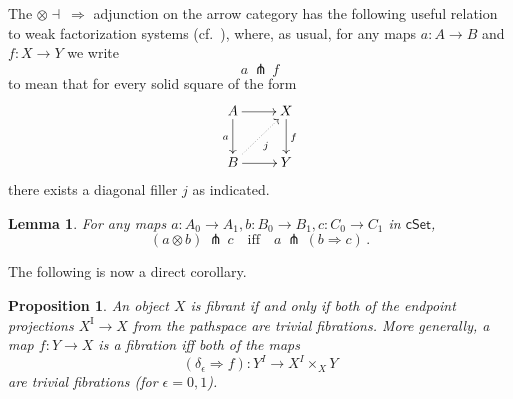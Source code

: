 \documentclass[11pt,reqno]{amsart}
\newcommand{\cSet}{\ensuremath{\mathsf{cSet}}}
\newcommand{\ra}{\ensuremath{\rightarrow}}
\renewcommand{\to}{\ensuremath{\rightarrow}}
\newcommand{\I}{\ensuremath{\mathrm{I}}}
\newtheorem{proposition}[theorem]{Proposition}
\newtheorem{lemma}[theorem]{Lemma}
\theoremstyle{remark}
\theoremstyle{definition}
\begin{document}
The $\otimes\dashv\ \Rightarrow$ adjunction on the arrow category has the following useful relation to weak factorization systems (cf.~\cite{GS,Riehl,JT:notes}), where, as usual, for any maps $a : A \ra B$ and $f : X\ra Y$ we write 
\[
a\, \pitchfork\, f 
\]
to mean that for every solid square of the form
\begin{equation}\label{eq:defpitchfork}
\xymatrix{
A\ar[d]_{a} \ar[r] & X \ar[d]^f \\
B \ar@{.>}[ru]_j \ar[r] & Y
}
\end{equation}
there exists a diagonal filler $j$ as indicated. 

\begin{lemma}\label{lemma:Leibniz}
For any maps $a : A_0 \to A_1, b : B_0 \to B_1, c : C_0 \to C_1$ in $\cSet$,
\[
(a\otimes b)\, \pitchfork\, c\quad\text{iff}\quad a\, \pitchfork\, (b\Rightarrow\! c)\,.
\]
\end{lemma}

The following is now a direct corollary.

\begin{proposition}\label{prop:algequivfill}
An object $X$ is fibrant if and only if both of the endpoint  projections $X^\I \ra X$ from the pathspace are trivial fibrations. More generally, a map $f : Y\ra X$ is a fibration iff both of the maps 
\[
(\delta_\epsilon \Rightarrow f) : Y^I \ra X^I\times_X Y
\]
 are trivial fibrations (for $\epsilon = 0,1$).
\end{proposition}
\end{document}
